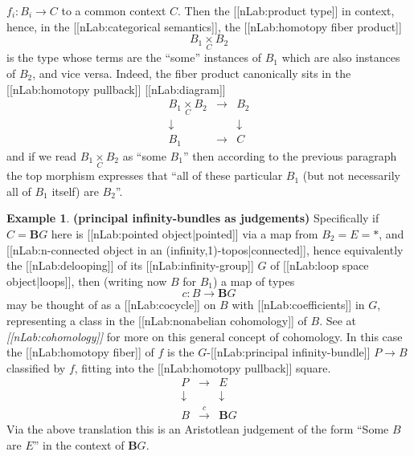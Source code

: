 \documentclass[12pt,titlepage]{article}
\newcommand{\itexarray}[1]{\begin{matrix}#1\end{matrix}}
\theoremstyle{plain}
\theoremstyle{definition}
\newtheorem{example}{Example}
\theoremstyle{remark}
\begin{document}
$f_i \colon B_i \longrightarrow C$
to a common context $C$. Then the [[nLab:product type]] in context, hence, in the [[nLab:categorical semantics]], the [[nLab:homotopy fiber product]]
\begin{displaymath}
B_1 \underset{C}{\times} B_2
\end{displaymath}
is the type whose terms are the ``some'' instances of $B_1$ which are also instances of $B_2$, and vice versa. Indeed, the fiber product canonically sits in the [[nLab:homotopy pullback]] [[nLab:diagram]]
\begin{displaymath}
\itexarray{
    B_1 \underset{C}{\times} B_2
    &\longrightarrow&
    B_2
    \\
    \downarrow && \downarrow
    \\
    B_1 &\longrightarrow& C
  }
\end{displaymath}
and if we read $B_1 \underset{C}{\times} B_2$ as ``some $B_1$'' then according to the previous paragraph the top morphism expresses that ``all of these particular $B_1$ (but not necessarily all of $B_1$ itself) are $B_2$''.
\begin{example}
\label{PrincipalBundlesAsJudgements}\hypertarget{PrincipalBundlesAsJudgements}{}
\textbf{(principal infinity-bundles as judgements)}
Specifically if $C = \mathbf{B}G$ here is [[nLab:pointed object|pointed]] via a map from $B_2 = E = \ast$, and [[nLab:n-connected object in an (infinity,1)-topos|connected]], hence equivalently the [[nLab:delooping]] of its [[nLab:infinity-group]] $G$ of [[nLab:loop space object|loops]], then (writing now $B$ for $B_1$) a map of types
\begin{displaymath}
c \colon B \longrightarrow \mathbf{B}G
\end{displaymath}
may be thought of as a [[nLab:cocycle]] on $B$ with [[nLab:coefficients]] in $G$, representing a class in the [[nLab:nonabelian cohomology]] of $B$. See at \emph{[[nLab:cohomology]]} for more on this general concept of cohomology.
In this case the [[nLab:homotopy fiber]] of $f$ is the $G$-[[nLab:principal infinity-bundle]] $P \to B$ classified by $f$, fitting into the [[nLab:homotopy pullback]] square.
\begin{displaymath}
\itexarray{
    P &\longrightarrow& E
    \\
    \downarrow && \downarrow
    \\
    B &\stackrel{c}{\longrightarrow} & \mathbf{B}G
  }
\end{displaymath}
Via the above translation this is an Aristotlean judgement of the form ``Some $B$ are $E$'' in the context of $\mathbf{B}G$.
\end{example}
\end{document}
